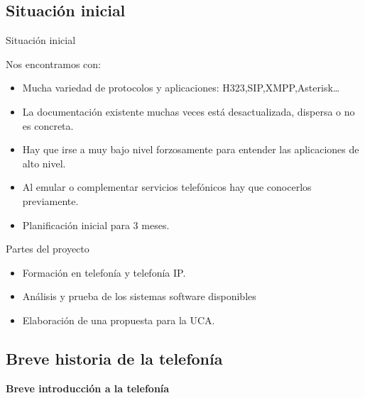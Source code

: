 \documentclass{beamer}
\begin{document}
\subsection{Situación inicial}

\begin{frame}{Situación inicial}
  \begin{block}{Nos encontramos con:}
    \begin{itemize}
    \item Mucha variedad de protocolos y aplicaciones: H323,SIP,XMPP,Asterisk\ldots
    \item La documentación existente muchas veces está desactualizada, dispersa o no es concreta.
    \item Hay que irse a muy bajo nivel forzosamente para entender las aplicaciones de alto nivel.
    \item Al emular o complementar servicios telefónicos hay que conocerlos previamente.
    \item Planificación inicial para 3 meses.
    \end{itemize}
  \end{block}
\end{frame}

\begin{frame}
  \begin{block}{Partes del proyecto}
    \begin{itemize}
    \item Formación en telefonía y telefonía IP.
    \item Análisis y prueba de los sistemas software disponibles
    \item Elaboración de una propuesta para la UCA.
    \end{itemize}
  \end{block}
\end{frame}


\subsection{Breve historia de la telefonía}


\begin{frame}
  \begin{center}
    \huge{\textbf{Breve introducción a la telefonía}}
  \end{center}
\end{frame}
\end{document}
